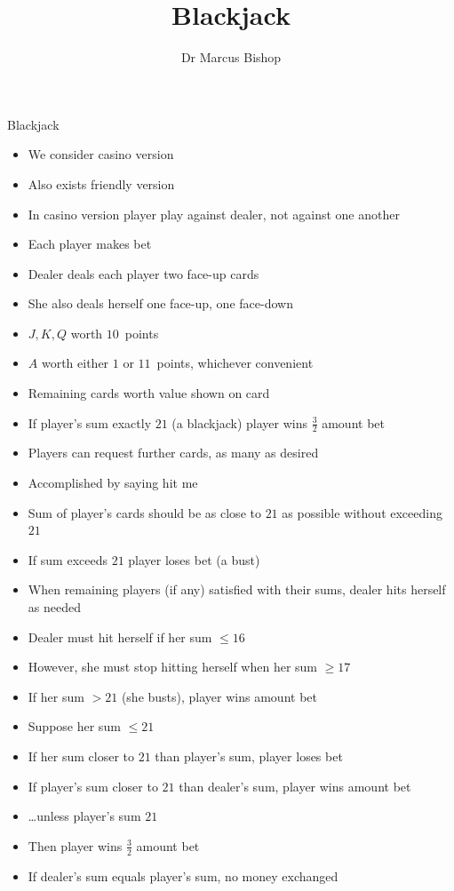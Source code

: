 \documentclass[handout]{beamer}
\title[Blackjack]{Blackjack}
\author{Dr Marcus Bishop}
\theoremstyle{definition}
\begin{document}
\begin{frame}\titlepage\end{frame}
\LogoOff

\begin{frame}{Blackjack}
\begin{itemize}
\item We consider casino version
\item Also exists friendly version
\item In casino version player play against dealer, not against one another
\item Each player makes bet
\item Dealer deals each player two face-up cards
\item She also deals herself one face-up, one face-down
\item $J,K,Q$ worth $10$~points
\item $A$ worth either $1$ or $11$~points, whichever convenient
\item Remaining cards worth value shown on card
\end{itemize}
\end{frame}

\begin{frame}
\begin{itemize}
\item If player's sum exactly $21$ (a \alert{blackjack}) player wins
$\frac{3}{2}$ amount bet
\item Players can request further cards, as many as desired
\item Accomplished by saying \alert{hit me}
\item Sum of player's cards should be as close to $21$ as possible
without exceeding $21$
\item If sum exceeds $21$ player loses bet (a \alert{bust})
\end{itemize}
\end{frame}

\begin{frame}
\begin{itemize}
\item When remaining players (if any) satisfied with their sums,
dealer hits herself as needed
\item Dealer \alert{must} hit herself if her sum $\le 16$
\item However, she must stop hitting herself when her sum $\ge 17$
\item If her sum $>21$ (she \alert{busts}), player wins amount bet
\item Suppose her sum $\le 21$
\item If her sum closer to $21$ than player's sum,
player loses bet
\item If player's sum closer to $21$ than dealer's sum,
player wins amount bet
\item \dots unless player's sum $21$
\item Then player wins $\frac{3}{2}$ amount bet
\item If dealer's sum equals player's sum, no money exchanged
\end{itemize}
\end{frame}
\end{document}
